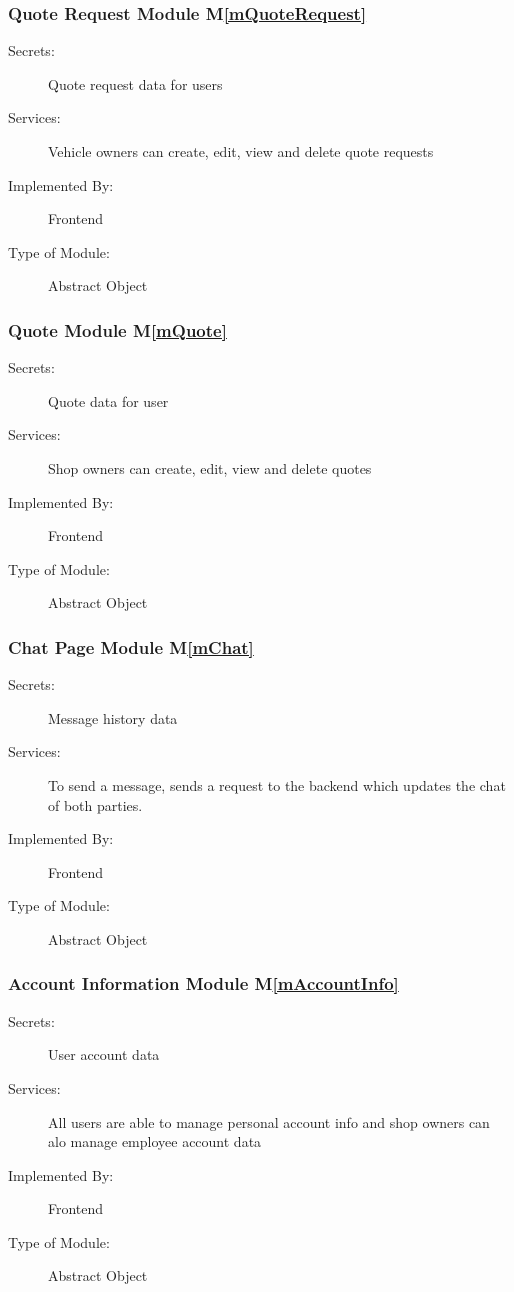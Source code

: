 \documentclass[12pt, titlepage]{article}
\newcommand{\mref}[1]{M\ref{#1}}
\begin{document}
\subsubsection{Quote Request Module \mref{mQuoteRequest}}

\begin{description}
\item[Secrets:]Quote request data for users
\item[Services:]Vehicle owners can create, edit, view and delete quote requests
\item[Implemented By:] Frontend
\item[Type of Module:] Abstract Object
\end{description}

\subsubsection{Quote Module \mref{mQuote}}

\begin{description}
\item[Secrets:]Quote data for user
\item[Services:]Shop owners can create, edit, view and delete quotes
\item[Implemented By:] Frontend
\item[Type of Module:] Abstract Object
\end{description}

\subsubsection{Chat Page Module \mref{mChat}}

\begin{description}
\item[Secrets:]Message history data
\item[Services:]To send a message, sends a request to the backend which updates the chat of both parties.
\item[Implemented By:] Frontend
\item[Type of Module:] Abstract Object
\end{description}

\subsubsection{Account Information Module \mref{mAccountInfo}}

\begin{description}
\item[Secrets:]User account data
\item[Services:]All users are able to manage personal account info and shop owners can alo manage employee account data
\item[Implemented By:] Frontend
\item[Type of Module:] Abstract Object
\end{description}
\end{document}
